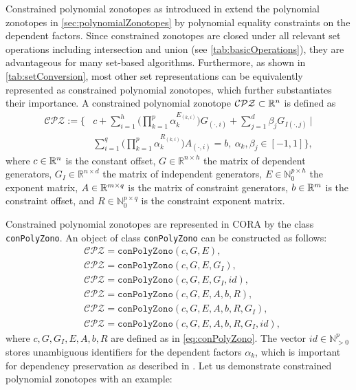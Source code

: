  \label{sec:conPolyZono}

Constrained polynomial zonotopes as introduced in \cite{Kochdumper2021c} extend the polynomial zonotopes in \cref{sec:polynomialZonotopes} by polynomial equality constraints on the dependent factors. Since constrained zonotopes are closed under all relevant set operations including intersection and union (see \cref{tab:basicOperations}), they are advantageous for many set-based algorithms. Furthermore, as shown in \cref{tab:setConversion}, most other set representations can be equivalently represented as constrained polynomial zonotopes, which further substantiates their importance. A constrained polynomial zonotope $\mathcal{CPZ} \subset \mathbb{R}^n$ is defined as
\begin{equation}
	\begin{split}
    \mathcal{CPZ} := \bigg\{ & c + \sum _{i=1}^h \bigg( \prod _{k=1}^p \alpha _k ^{E_{(k,i)}} \bigg) G_{(\cdot,i)} + \sum _{j=1}^{d} \beta _j G_{I(\cdot,j)} ~ \bigg| \\
    &  \sum _{i=1}^q \bigg( \prod _{k=1}^p \alpha _k ^{R_{(k,i)}} \bigg) A_{(\cdot,i)} = b, ~\alpha_k, \beta_j \in [-1,1] \bigg\},
    \end{split}
  \label{eq:conPolyZono}
\end{equation}
where $c \in \mathbb{R}^n$ is the constant offset, $G \in \mathbb{R}^{n \times h}$ the matrix of dependent generators, $G_I \in \mathbb{R}^{n \times d}$ the matrix of independent generators,  $E \in \mathbb{N}_{0}^{p \times h}$ the exponent matrix, $A \in \mathbb{R}^{m \times q}$ is the matrix of constraint generators, $b \in \mathbb{R}^m$ is the constraint offset, and $R \in \mathbb{N}_{0}^{p \times q}$ is the constraint exponent matrix. 

Constrained polynomial zonotopes are represented in CORA by the class \texttt{conPolyZono}. An object of class \texttt{conPolyZono} can be constructed as follows:
\begin{equation*}
\begin{split}
	& \mathcal{CPZ} = \texttt{conPolyZono}(c,G,E), \\
    & \mathcal{CPZ} = \texttt{conPolyZono}(c,G,E,G_I), \\
    & \mathcal{CPZ} = \texttt{conPolyZono}(c,G,E,G_I,id), \\
    & \mathcal{CPZ} = \texttt{conPolyZono}(c,G,E,A,b,R), \\
    & \mathcal{CPZ} = \texttt{conPolyZono}(c,G,E,A,b,R,G_I), \\
    & \mathcal{CPZ} = \texttt{conPolyZono}(c,G,E,A,b,R,G_I,id),
\end{split}
\end{equation*} 
where $c,G,G_I,E,A,b,R$ are defined as in \eqref{eq:conPolyZono}. The vector $id \in \mathbb{N}^p_{> 0}$ stores unambiguous identifiers for the dependent factors $\alpha_k$, which is important for dependency preservation as described in \cite{Kochdumper2020c}. Let us demonstrate constrained polynomial zonotopes with an example:

